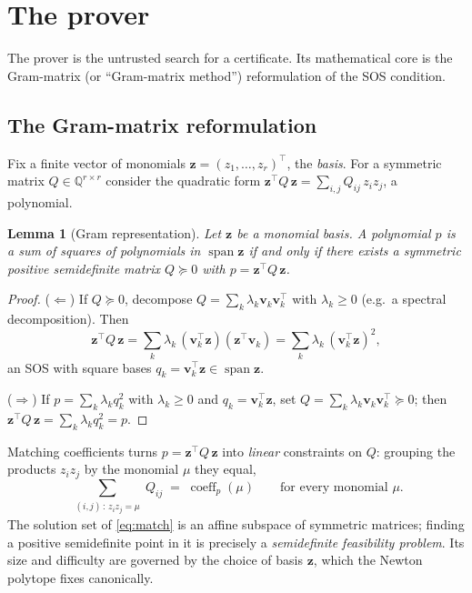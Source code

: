 \documentclass[11pt]{article}
\theoremstyle{definition}
\theoremstyle{plain}
\newtheorem{lemma}[definition]{Lemma}
\newcommand{\Q}{\mathbb{Q}}
\newcommand{\z}{\mathbf{z}}
\newcommand{\vv}{\mathbf{v}}
\newcommand{\psd}{\succeq 0}
\newcommand{\transpose}{^{\!\top}}
\DeclareMathOperator{\coeff}{coeff}
\begin{document}
\section{The prover}
\label{sec:prover}

The prover is the untrusted search for a certificate. Its mathematical core is
the Gram-matrix (or ``Gram-matrix method'') reformulation of the SOS condition.

\subsection{The Gram-matrix reformulation}

Fix a finite vector of monomials $\z = (z_1,\dots,z_r)\transpose$, the
\emph{basis}. For a symmetric matrix $Q \in \Q^{r\times r}$ consider the
quadratic form $\z\transpose Q\, \z = \sum_{i,j} Q_{ij}\, z_i z_j$, a polynomial.

\begin{lemma}[Gram representation]\label{lem:gram}
Let $\z$ be a monomial basis. A polynomial $p$ is a sum of squares of
polynomials in $\operatorname{span}\z$ \emph{if and only if} there exists a
symmetric positive semidefinite matrix $Q \psd$ with
$p = \z\transpose Q\, \z$.
\end{lemma}
\begin{proof}
($\Leftarrow$) If $Q \psd$, decompose $Q = \sum_k \lambda_k \vv_k \vv_k\transpose$
with $\lambda_k \ge 0$ (e.g.\ a spectral decomposition). Then
\[
  \z\transpose Q\, \z
  = \sum_k \lambda_k\, (\vv_k\transpose \z)(\z\transpose \vv_k)
  = \sum_k \lambda_k\, (\vv_k\transpose \z)^2 ,
\]
an SOS with square bases $q_k = \vv_k\transpose \z \in \operatorname{span}\z$.

($\Rightarrow$) If $p = \sum_k \lambda_k q_k^2$ with $\lambda_k \ge 0$ and
$q_k = \vv_k\transpose \z$, set $Q = \sum_k \lambda_k \vv_k \vv_k\transpose \psd$;
then $\z\transpose Q\,\z = \sum_k \lambda_k q_k^2 = p$.
\end{proof}

Matching coefficients turns $p = \z\transpose Q\,\z$ into \emph{linear}
constraints on $Q$: grouping the products $z_i z_j$ by the monomial $\mu$ they
equal,
\begin{equation}\label{eq:match}
  \sum_{\substack{(i,j)\,:\, z_i z_j = \mu}} Q_{ij}
  \;=\; \coeff_p(\mu)
  \qquad \text{for every monomial } \mu .
\end{equation}
The solution set of \eqref{eq:match} is an affine subspace of symmetric
matrices; finding a positive semidefinite point in it is precisely a
\emph{semidefinite feasibility problem}. Its size and difficulty are governed by
the choice of basis $\z$, which the Newton polytope fixes canonically.
\end{document}
